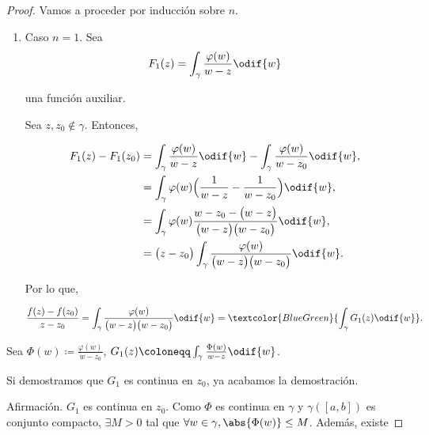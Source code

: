 \documentclass[../main.tex]{subfiles}
\begin{document}
\begin{proof}
    Vamos a proceder por inducción sobre \(n\).

    \begin{enumerate}
        \item Caso \(n = 1\).
            Sea
            \begin{equation*}
                F_{1}(z) = \int_{\gamma}^{}\dfrac{\varphi(w)}{w - z}\odif{w}
            \end{equation*}

            una función auxiliar.

            Sea \(z, z_{0} \notin \gamma\). Entonces,

            \begin{align*}
                F_{1}(z) - F_{1}(z_{0}) &=
                \int_{\gamma}^{}\dfrac{\varphi(w)}{w - z}\odif{w} -
                \int_{\gamma}^{}\dfrac{\varphi(w)}{w - z_{0}}\odif{w},\\
                &= \int_{\gamma}^{}\varphi(w)\Bigl(\dfrac{1}{w - z} - \dfrac{1}{w -
                z_{0}}\Bigr)\odif{w},\\
                &= \int_{\gamma}^{}\varphi(w)\dfrac{w - z_{0} - \bigl(w -
                z\bigr)}{\bigl(w - z\bigr)\bigl(w -
                z_{0}\bigr)}\odif{w},\\
                &= \bigl(z -
                z_{0}\bigr)\int_{\gamma}^{}\dfrac{\varphi(w)}{\bigl(w - z\bigr)\bigl(w -
                z_{0}\bigr)}\odif{w}.
            \end{align*}

            Por lo que,

            \begin{equation*}
                \dfrac{f(z) - f(z_{0})}{z - z_{0}} =
                \int_{\gamma}^{}\dfrac{\varphi(w)}{\bigl(w -
                z\bigr)\bigl(w - z_{0}\bigr)}\odif{w} =
                \textcolor{BlueGreen}{\int_{\gamma}^{}G_{1}(z)\odif{w}}.
            \end{equation*}
    \end{enumerate}

    Sea \(\Phi(w) \coloneqq \tfrac{\varphi(w)}{w - z_{0}}\), \(G_{1}(z) \coloneqq
    \int_{\gamma}^{}\tfrac{\Phi(w)}{w - z}\odif{w}\).

    Si demostramos que \(G_{1}\) es continua en \(z_{0}\), ya acabamos la demostración.

    \textcolor{JungleGreen}{Afirmación.} \(G_{1}\) es continua en \(z_{0}\).
    Como \(\Phi\)
    es continua en \(\gamma\) y \(\gamma([a, b])\) es conjunto compacto,
    \(\exists M > 0\)
    tal que \(\forall w\in \gamma, \abs{\Phi(w)} \leq M\). Además, existe


\end{proof}
\end{document}
